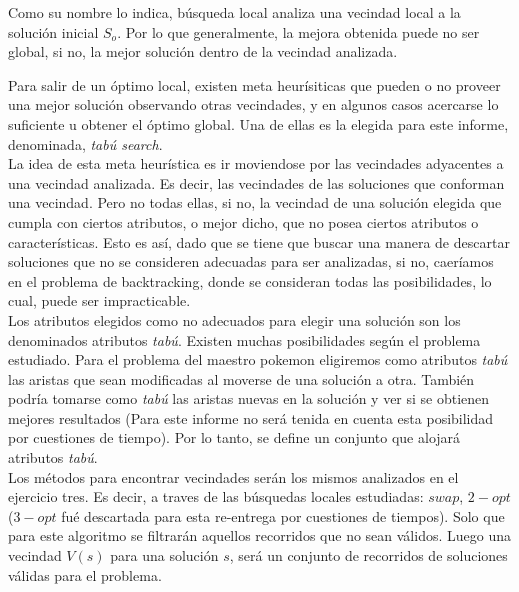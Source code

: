Como su nombre lo indica, búsqueda local analiza una vecindad local a la solución inicial $S_o$. Por lo que generalmente, la mejora obtenida puede no ser global, si no, la mejor solución dentro de la vecindad analizada. 

Para salir de un óptimo local, existen meta heurísiticas que pueden o no proveer una mejor solución observando otras vecindades, y en algunos casos acercarse lo suficiente u obtener el óptimo global. Una de ellas es la elegida para este informe, denominada, \textit{tab\'u search}.\\

La idea de esta meta heurística es ir moviendose por las vecindades adyacentes a una vecindad analizada. Es decir, las vecindades de las soluciones que conforman una vecindad.
Pero no todas ellas, si no, la vecindad de una solución elegida que cumpla con ciertos atributos, o mejor dicho, que no posea ciertos atributos o características. 
Esto es así, dado que se tiene que buscar una manera de descartar soluciones que no se consideren adecuadas para ser analizadas, si no, caeríamos en el problema de backtracking, donde se consideran todas las posibilidades, lo cual, puede ser impracticable.\\

Los atributos elegidos como no adecuados para elegir una solución son los denominados atributos \textit{tab\'u}. Existen muchas posibilidades según el problema estudiado. Para el problema del maestro pokemon eligiremos como atributos \textit{tabú} las aristas que sean modificadas al moverse de una solución a otra. También podría tomarse como \textit{tabú} las aristas nuevas en la solución y ver si se obtienen mejores resultados (Para este informe no será tenida en cuenta esta posibilidad por cuestiones de tiempo).
Por lo tanto, se define un conjunto que alojará atributos \textit{tabú}.\\

Los métodos para encontrar vecindades serán los mismos analizados en el ejercicio tres. Es decir, a traves de las búsquedas locales estudiadas: $swap$, $2-opt$ ($3-opt$ fué descartada para esta re-entrega por cuestiones de tiempos). Solo que para este algoritmo se filtrarán aquellos recorridos que no sean válidos. Luego una vecindad $V(s)$ para una solución $s$, será un conjunto de recorridos de soluciones válidas para el problema.\\

